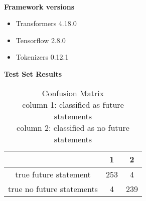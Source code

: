 \begin{table}[ht]
    \setlength\tabcolsep{2pt} %
    \footnotesize\centering
    \captionsetup{size=footnotesize}
    \caption{\label{future-model-train}
    Training Results
    }
\end{table}
%
%
\\
\textbf{Framework versions}
\begin{itemize}
    \item Transformers 4.18.0
    \item Tensorflow 2.8.0
    \item Tokenizers 0.12.1
\end{itemize}%
%
\textbf{Test Set Results}
\begin{table}[ht]
    \small
    \captionsetup{size=footnotesize}
        \begin{tabular}{c|cc}
        \hline
        & 1 & 2\\
        \hline
        true future statement & 253 & 4 \\
        true no future statements & 4 & 239 \\
        \hline
        \end{tabular}
    \caption{\label{cm}
    Confusion Matrix\\
    column 1: classified as future statements\\
    column 2: classified as no future statements
    }
\end{table}
